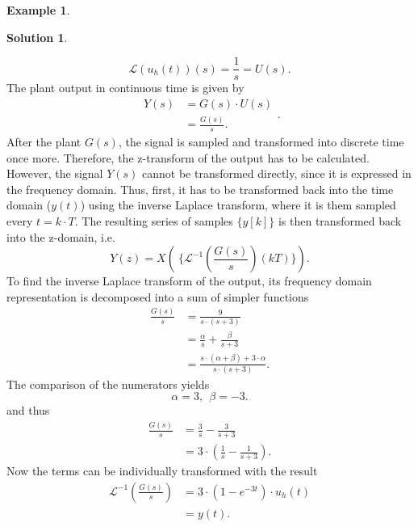 \documentclass[a4paper,12 pt]{article}
\numberwithin{equation}{section}
\theoremstyle{definition}
\newtheorem{bsp}{Example}
\theoremstyle{remark}
\theoremstyle{definition}
\newtheorem*{lsg}{Solution}
\theoremstyle{definition}
\theoremstyle{definition}
\theoremstyle{remark}
\begin{document}
\begin{bsp}
\begin{lsg}
\begin{enumerate}[(a)]
\begin{equation*}
\mathscr{L}(u_h(t))(s)=\frac{1}{s}=U(s).
\end{equation*}
The plant output in continuous time is given by
\begin{equation*}
\begin{split}
Y(s)&=G(s)\cdot U(s)\\
&=\frac{G(s)}{s}.
\end{split}.
\end{equation*}
After the plant $G(s)$, the signal is sampled and transformed into discrete time once more. Therefore, the z-transform of the output has to be calculated. However, the signal $Y(s)$ cannot be  transformed directly, since it is expressed in the frequency domain. Thus, first, it has to be transformed back into the time domain ($y(t)$) using the inverse Laplace transform, where it is them sampled every $t=k\cdot T$. The resulting series of samples $\{y[k]\}$ is then transformed back into the z-domain, i.e.
\begin{equation*}
Y(z)=X\left(\ \{ \mathscr{L}^{-1}\left(\frac{G(s)}{s} \right)(kT) \}\right).
\end{equation*}
To find the inverse Laplace transform of the output, its frequency domain representation is decomposed into a sum of simpler functions
\begin{equation*}
\begin{split}
\frac{G(s)}{s}&=\frac{9}{s\cdot (s+3)}\\
&=\frac{\alpha}{s}+\frac{\beta}{s+3}\\
&=\frac{s\cdot (\alpha + \beta)+3\cdot \alpha}{s\cdot (s+3)}.
\end{split}
\end{equation*}
The comparison of the numerators yields
$$\alpha=3,\ \ \beta=-3.$$
and thus
\begin{equation*}
\begin{split}
\frac{G(s)}{s}&=\frac{3}{s}-\frac{3}{s+3}\\
&=3\cdot \left(\frac{1}{s}-\frac{1}{s+3}\right).
\end{split}
\end{equation*}
Now the terms can be individually transformed with the result
\begin{equation*}
\begin{split}
\mathscr{L}^{-1}\left( \frac{G(s)}{s}\right)&=3\cdot \left(1-e^{-3t}\right) \cdot u_h(t)\\
&=y(t).
\end{split}
\end{equation*}

\end{enumerate}
\end{lsg}
\end{bsp}
\end{document}
